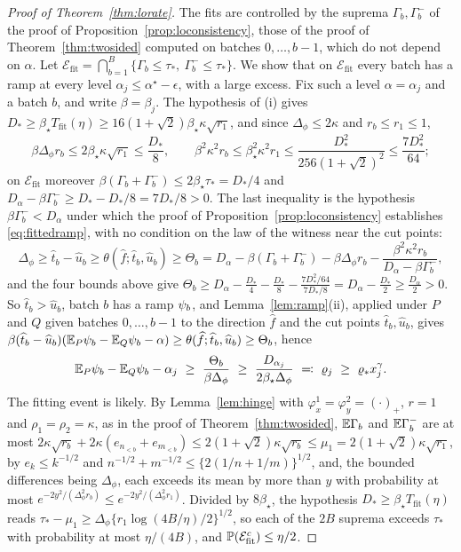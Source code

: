 \begin{proof}[Proof of Theorem~\ref{thm:lorate}]
The fits are controlled by the suprema $\Gamma_b,\Gamma_b^-$ of the proof of Proposition~\ref{prop:loconsistency},
those of the proof of Theorem~\ref{thm:twosided} computed on batches $0,\dots,b-1$, which do not depend on $\alpha$. Let
$\mathcal E_{\mathrm{fit}}=\bigcap_{b=1}^B\{\Gamma_b\le\tau_*,\ \Gamma_b^-\le\tau_*\}$. We show that on
$\mathcal E_{\mathrm{fit}}$ every batch has a ramp at every level $\alpha_j\le\alpha^\star-\epsilon$, with a large
excess. Fix such a level $\alpha=\alpha_j$ and a batch $b$, and write $\beta=\beta_j$. The hypothesis of (i) gives
$D_*\ge\beta_\star T_{\mathrm{fit}}(\eta)\ge16(1+\sqrt2)\beta_\star\kappa\sqrt{r_1}$, and since $\Delta_\phi\le2\kappa$
and $r_b\le r_1\le1$,
\[
\beta\Delta_\phi r_b\le2\beta_\star\kappa\sqrt{r_1}\le\frac{D_*}8,
\qquad
\beta^2\kappa^2r_b\le\beta_\star^2\kappa^2r_1\le\frac{D_*^2}{256(1+\sqrt2)^2}\le\frac{7D_*^2}{64};
\]
on $\mathcal E_{\mathrm{fit}}$ moreover $\beta(\Gamma_b+\Gamma_b^-)\le2\beta_\star\tau_*=D_*/4$ and
$D_\alpha-\beta\Gamma_b^-\ge D_*-D_*/8=7D_*/8>0$. The last inequality is the hypothesis
$\beta\Gamma_b^-<D_\alpha$ under which the proof of Proposition~\ref{prop:loconsistency} establishes
\eqref{eq:fittedramp}, with no condition on the law of the witness near the cut points:
\[
\Delta_\phi\ge\widehat t_b-\widehat u_b\ge\theta(\widehat f;\widehat t_b,\widehat u_b)\ge\Theta_b
=D_\alpha-\beta(\Gamma_b+\Gamma_b^-)-\beta\Delta_\phi r_b-\frac{\beta^2\kappa^2r_b}{D_\alpha-\beta\Gamma_b^-},
\]
and the four bounds above give $\Theta_b\ge D_\alpha-\frac{D_*}4-\frac{D_*}8-\frac{7D_*^2/64}{7D_*/8}=D_\alpha-\frac{D_*}2
\ge\frac{D_\alpha}2>0$. So $\widehat t_b>\widehat u_b$, batch $b$ has a ramp $\psi_b$, and Lemma~\ref{lem:ramp}(ii),
applied under $P$ and $Q$ given batches $0,\dots,b-1$ to the direction $\widehat f$ and the cut points $\widehat
t_b,\widehat u_b$, gives $\beta(\widehat t_b-\widehat u_b)(\mathbb{E}_P\psi_b-\mathbb{E}_Q\psi_b-\alpha)\ge\theta(\widehat f;\widehat
t_b,\widehat u_b)\ge\Theta_b$, hence
\begin{equation}
\E_P\rp_b-\E_Q\rp_b-\alpha_j\ \ge\ \frac{\Theta_b}{\beta\Delta_\phi}\ \ge\ \frac{D_{\alpha_j}}{2\beta_\star\Delta_\phi}
\ \eqqcolon\ \varrho_j\ \ge\ \varrho_*x_j^\gamma .
\label{eq:excessj}
\end{equation}
The fitting event is likely. By Lemma~\ref{lem:hinge} with $\varphi^1_x=\varphi^2_y=(\cdot)_+$, $r=1$ and
$\rho_1=\rho_2=\kappa$, as in the proof of Theorem~\ref{thm:twosided}, $\mathbb{E}\Gamma_b$ and $\mathbb{E}\Gamma_b^-$ are at most
$2\kappa\sqrt{r_b}+2\kappa(e_{n_{<b}}+e_{m_{<b}})\le2(1+\sqrt2)\kappa\sqrt{r_b}\le\mu_1=2(1+\sqrt2)\kappa\sqrt{r_1}$, by
$e_k\le k^{-1/2}$ and $n^{-1/2}+m^{-1/2}\le\{2(1/n+1/m)\}^{1/2}$, and, the bounded differences being $\Delta_\phi$, each
exceeds its mean by more than $y$ with probability at most $e^{-2y^2/(\Delta_\phi^2r_b)}\le e^{-2y^2/(\Delta_\phi^2r_1)}$.
Divided by $8\beta_\star$, the hypothesis $D_*\ge\beta_\star T_{\mathrm{fit}}(\eta)$ reads
$\tau_*-\mu_1\ge\Delta_\phi\{r_1\log(4B/\eta)/2\}^{1/2}$, so each of the $2B$ suprema exceeds $\tau_*$ with probability at
most $\eta/(4B)$, and $\mathbb{P}(\mathcal E_{\mathrm{fit}}^c)\le\eta/2$.


\end{proof}
